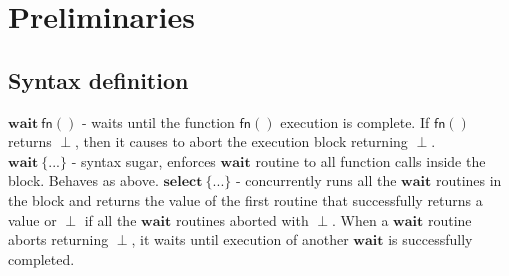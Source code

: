 \documentclass{article}      	%
\begin{document}
%

\section{Preliminaries}


\subsection{Syntax definition}
$\mathbf{wait} \: \mathsf{fn}()$ - waits until the function $\mathsf{fn}()$ execution is complete. If $\mathsf{fn}()$ returns $\perp$, then it causes to abort the execution block returning $\perp$. \\
$\mathbf{wait} \: \{...\}$ - syntax sugar, enforces $\mathbf{wait}$ routine to all function calls inside the block. Behaves as above.
$\mathbf{select} \: \{...\}$ - concurrently runs all the $\mathbf{wait}$ routines in the block and returns the value of the first routine that successfully returns a value or $\perp$ if all the $\mathbf{wait}$ routines aborted with $\perp$. When a $\mathbf{wait}$ routine aborts returning $\perp$, it waits until execution of another $\mathbf{wait}$ is successfully completed. 
\end{document}
